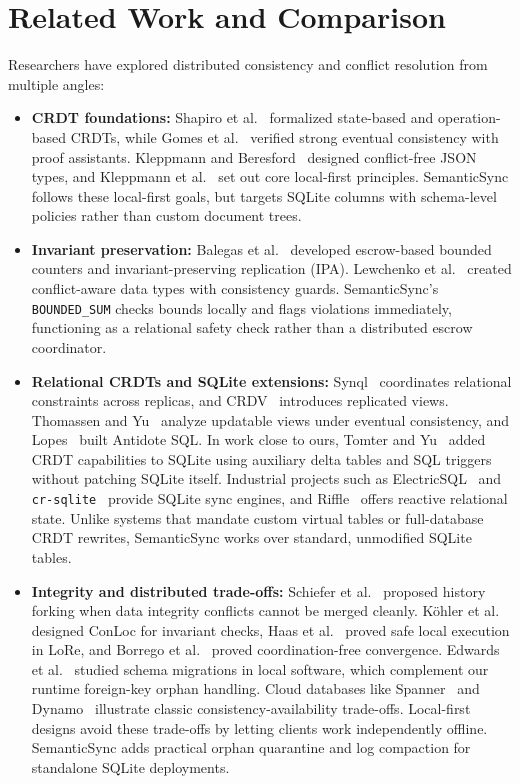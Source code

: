 \documentclass[conference]{IEEEtran}
\begin{document}
\section{Related Work and Comparison}

Researchers have explored distributed consistency and conflict resolution from multiple angles:
\begin{itemize}
    \item \textbf{CRDT foundations:} Shapiro et al.~\cite{shapiro2011crdt} formalized state-based and operation-based CRDTs, while Gomes et al.~\cite{gomes2017verifying} verified strong eventual consistency with proof assistants. Kleppmann and Beresford~\cite{kleppmann2017json} designed conflict-free JSON types, and Kleppmann et al.~\cite{kleppmann2019localfirst} set out core local-first principles. SemanticSync follows these local-first goals, but targets SQLite columns with schema-level policies rather than custom document trees.
    \item \textbf{Invariant preservation:} Balegas et al.~\cite{balegas2015numeric, balegas2018ipa} developed escrow-based bounded counters and invariant-preserving replication (IPA). Lewchenko et al.~\cite{lewchenko2018cardt} created conflict-aware data types with consistency guards. SemanticSync's \texttt{BOUNDED\_SUM} checks bounds locally and flags violations immediately, functioning as a relational safety check rather than a distributed escrow coordinator.
    \item \textbf{Relational CRDTs and SQLite extensions:} Synql~\cite{synql2024} coordinates relational constraints across replicas, and CRDV~\cite{crdv2025} introduces replicated views. Thomassen and Yu~\cite{thomassen2023} analyze updatable views under eventual consistency, and Lopes~\cite{antidotesql2018} built Antidote SQL. In work close to ours, Tomter and Yu~\cite{tomter2021} added CRDT capabilities to SQLite using auxiliary delta tables and SQL triggers without patching SQLite itself. Industrial projects such as ElectricSQL~\cite{electricsql2026} and \texttt{cr-sqlite}~\cite{crsqlite2026} provide SQLite sync engines, and Riffle~\cite{riffle2023} offers reactive relational state. Unlike systems that mandate custom virtual tables or full-database CRDT rewrites, SemanticSync works over standard, unmodified SQLite tables.
    \item \textbf{Integrity and distributed trade-offs:} Schiefer et al.~\cite{schiefer2022fork} proposed history forking when data integrity conflicts cannot be merged cleanly. K{\"o}hler et al.~\cite{conloc2025} designed ConLoc for invariant checks, Haas et al.~\cite{lore2024} proved safe local execution in LoRe, and Borrego et al.~\cite{borrego2025} proved coordination-free convergence. Edwards et al.~\cite{edwards2023} studied schema migrations in local software, which complement our runtime foreign-key orphan handling. Cloud databases like Spanner~\cite{spanner2013} and Dynamo~\cite{dynamo2007} illustrate classic consistency-availability trade-offs. Local-first designs avoid these trade-offs by letting clients work independently offline. SemanticSync adds practical orphan quarantine and log compaction for standalone SQLite deployments.
\end{itemize}
\end{document}
